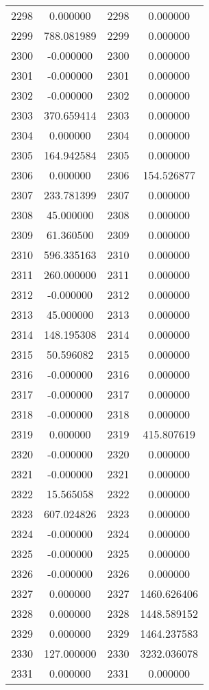 \documentclass[12pt]{article}
\begin{document}
\begin{longtable}{@{}cccc@{}}
2298 & 0.000000 & 2298 & 0.000000 \\
2299 & 788.081989 & 2299 & 0.000000 \\
2300 & -0.000000 & 2300 & 0.000000 \\
2301 & -0.000000 & 2301 & 0.000000 \\
2302 & -0.000000 & 2302 & 0.000000 \\
2303 & 370.659414 & 2303 & 0.000000 \\
2304 & 0.000000 & 2304 & 0.000000 \\
2305 & 164.942584 & 2305 & 0.000000 \\
2306 & 0.000000 & 2306 & 154.526877 \\
2307 & 233.781399 & 2307 & 0.000000 \\
2308 & 45.000000 & 2308 & 0.000000 \\
2309 & 61.360500 & 2309 & 0.000000 \\
2310 & 596.335163 & 2310 & 0.000000 \\
2311 & 260.000000 & 2311 & 0.000000 \\
2312 & -0.000000 & 2312 & 0.000000 \\
2313 & 45.000000 & 2313 & 0.000000 \\
2314 & 148.195308 & 2314 & 0.000000 \\
2315 & 50.596082 & 2315 & 0.000000 \\
2316 & -0.000000 & 2316 & 0.000000 \\
2317 & -0.000000 & 2317 & 0.000000 \\
2318 & -0.000000 & 2318 & 0.000000 \\
2319 & 0.000000 & 2319 & 415.807619 \\
2320 & -0.000000 & 2320 & 0.000000 \\
2321 & -0.000000 & 2321 & 0.000000 \\
2322 & 15.565058 & 2322 & 0.000000 \\
2323 & 607.024826 & 2323 & 0.000000 \\
2324 & -0.000000 & 2324 & 0.000000 \\
2325 & -0.000000 & 2325 & 0.000000 \\
2326 & -0.000000 & 2326 & 0.000000 \\
2327 & 0.000000 & 2327 & 1460.626406 \\
2328 & 0.000000 & 2328 & 1448.589152 \\
2329 & 0.000000 & 2329 & 1464.237583 \\
2330 & 127.000000 & 2330 & 3232.036078 \\
2331 & 0.000000 & 2331 & 0.000000 \\

\end{longtable}
\end{document}

